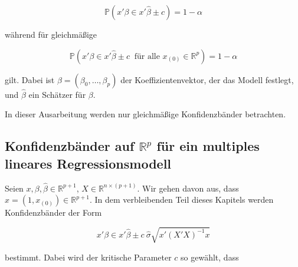 \documentclass[12pt,a4paper]{article}
\theoremstyle{definition}
\newtheorem{Beispiel}[Definition]{Beispiel}
\theoremstyle{definition}
\theoremstyle{definition}
\theoremstyle{definition}
\begin{document}
\begin{equation*}
\mathbb{P}(x'\beta \in x' \hat{\beta} \pm c) = 1-\alpha
\end{equation*}

während für gleichmäßige 

\begin{equation*}
\mathbb{P}(x'\beta \in x' \hat{\beta} \pm c ~ \text{ für alle } x_{(0)} \in \mathbb{R}^{p}) = 1-\alpha
\end{equation*}

gilt. Dabei ist $\beta=(\beta_{0}, \ldots, \beta_{p})$ der Koeffizientenvektor, der das Modell festlegt, und $\hat{\beta}$ ein Schätzer für $\beta$. 

In dieser Ausarbeitung werden nur gleichmäßige Konfidenzbänder betrachten.



%
%
%
%

 

\subsection{Konfidenzbänder auf $\mathbb{R}^{p}$ für ein multiples lineares Regressionsmodell}
\label{Konfidenzbaender auf R fuer ein multiples lineares Regressionsmodell}
Seien  $x,\beta, \hat{\beta}  \in \mathbb{R}^{p+1}$, $X \in \mathbb{R}^{n \times (p+1)}$. Wir gehen davon aus, dass $x = (1, x_{(0)}) \in \mathbb{R}^{p+1}$. In dem verbleibenden Teil dieses Kapitels werden Konfidenzbänder der Form

\begin{equation*} \label{KB_allgemein}
x' \beta \in x'\hat{\beta} \pm c ~ \hat{\sigma}\sqrt{x'(X'X)^{-1}x}
\end{equation*}

bestimmt. Dabei wird der kritische Parameter $c$ so gewählt, dass 
\end{document}
